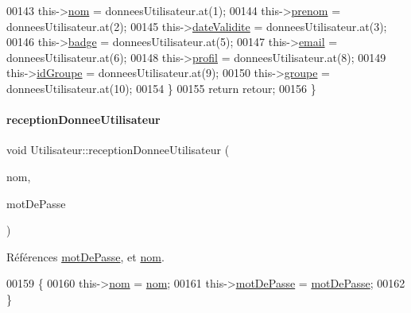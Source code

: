 \begin{DoxyCode}
00143         this->\hyperlink{class_utilisateur_a1096e809aca4b7cf453a7af93cb72502}{nom} = donneesUtilisateur.at(1);
00144         this->\hyperlink{class_utilisateur_a1dd0779807b19298f30f39d9c371170f}{prenom} = donneesUtilisateur.at(2);
00145         this->\hyperlink{class_utilisateur_a898cd6f5a64d733ad49a8a74388326cd}{dateValidite} = donneesUtilisateur.at(3);
00146         this->\hyperlink{class_utilisateur_a77b48aa9d1f0ec04c69d45476897fec6}{badge} = donneesUtilisateur.at(5);
00147         this->\hyperlink{class_utilisateur_a2f45443ce5277a5e6baefe5121e66555}{email} = donneesUtilisateur.at(6);
00148         this->\hyperlink{class_utilisateur_ab03707f32fadf99ae0a0a27d59470646}{profil} = donneesUtilisateur.at(8);
00149         this->\hyperlink{class_utilisateur_a13c3425772da1d5501e6fe4a2f2b8194}{idGroupe} = donneesUtilisateur.at(9);
00150         this->\hyperlink{class_utilisateur_af795d9518a4eebe00c5b24937732ab2b}{groupe} = donneesUtilisateur.at(10);
00154     \}
00155     \textcolor{keywordflow}{return} retour;
00156 \}
\end{DoxyCode}
\mbox{\label{class_utilisateur_a81311d8a9f62ffdfb8ee65d37461ea17}} 
\paragraph{\texorpdfstring{reception\+Donnee\+Utilisateur}{receptionDonneeUtilisateur}}
{\footnotesize\ttfamily void Utilisateur\+::reception\+Donnee\+Utilisateur (\begin{DoxyParamCaption}\item[{Q\+String}]{nom,  }\item[{Q\+String}]{mot\+De\+Passe }\end{DoxyParamCaption})\hspace{0.3cm}{\ttfamily [slot]}}



Références \hyperlink{class_utilisateur_a4f6a17d0fb5c231bcb414396236a056f}{mot\+De\+Passe}, et \hyperlink{class_utilisateur_a1096e809aca4b7cf453a7af93cb72502}{nom}.


\begin{DoxyCode}
00159 \{
00160     this->\hyperlink{class_utilisateur_a1096e809aca4b7cf453a7af93cb72502}{nom} = \hyperlink{class_utilisateur_a1096e809aca4b7cf453a7af93cb72502}{nom};
00161     this->\hyperlink{class_utilisateur_a4f6a17d0fb5c231bcb414396236a056f}{motDePasse} = \hyperlink{class_utilisateur_a4f6a17d0fb5c231bcb414396236a056f}{motDePasse};
00162 \}
\end{DoxyCode}
\mbox{\label{class_utilisateur_aec15176f18c3ae77a04214dd35e917db}} 
